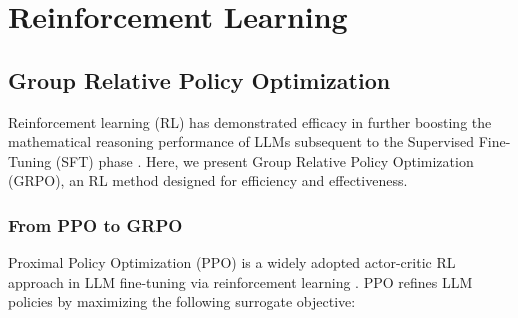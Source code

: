 \section{Reinforcement Learning}

\subsection{Group Relative Policy Optimization} Reinforcement learning (RL) has demonstrated efficacy in further boosting the mathematical reasoning performance of LLMs subsequent to the Supervised Fine-Tuning (SFT) phase \citep{wang2023math,wizardmath}. Here, we present Group Relative Policy Optimization (GRPO), an RL method designed for efficiency and effectiveness.

\subsubsection{From PPO to GRPO} Proximal Policy Optimization (PPO) \citep{schulman2017proximal} is a widely adopted actor-critic RL approach in LLM fine-tuning via reinforcement learning \citep{ouyang2022training}. PPO refines LLM policies by maximizing the following surrogate objective:

